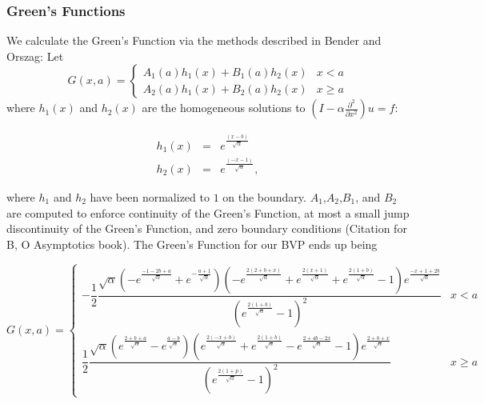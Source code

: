 \documentclass[11pt]{amsart}
\begin{document}
\subsubsection{Green's Functions}
We calculate the Green's Function via the methods described in Bender and Orszag: Let 
\begin{equation}
G(x,a)=\begin{cases}
A_1(a)h_1(x)+B_1(a)h_2(x) & x<a \\
A_2(a)h_1(x)+B_2(a)h_2(x) & x \geq a
\end{cases}
\end{equation}
where $h_1(x)$ and $h_2(x)$ are the homogeneous solutions to  $(I-\alpha \frac{\partial^2}{\partial x^2})u=f$:

\begin{eqnarray}
h_1(x) &=& e^{\frac{(x-b)}{\sqrt{\alpha}}} \\
h_2(x) &=& e^{\frac{(-x-1)}{\sqrt{\alpha}}},
\end{eqnarray}

where $h_1$ and $h_2$ have been normalized to $1$ on the boundary.  $A_1$,$A_2$,$B_1$, and $B_2$ are computed to enforce continuity of the Green's Function, at most a small jump discontinuity of the Green's Function, and zero boundary conditions (Citation for B, O Asymptotics book).  The Green's Function for our BVP ends up being

\begin{equation}
G(x,a)=\begin{cases} 
-\dfrac{1}{2} \dfrac{\sqrt{\alpha}\left(-e^{\frac{-1-2b+a}{\sqrt{\alpha}}}+e^{-\frac{a+1}{\sqrt{\alpha}}}\right)\left(-e^{\frac{2(2+b+x)}{\sqrt{\alpha}}}+e^{\frac{2(x+1)}{\sqrt{\alpha}}}+e^{\frac{2(1+b)}{\sqrt{\alpha}}}-1\right)e^{\frac{-x+1+2b}{\sqrt{\alpha}}}}{\left(e^{\frac{2(1+b)}{\sqrt{\alpha}}}-1\right)^2} & x<a \\
\dfrac{1}{2} \dfrac{\sqrt{\alpha} \left(e^{\frac{2+b+a}{\sqrt{\alpha}}} -e^{\frac{a-b}{\sqrt{\alpha}}}\right)\left(e^{\frac{2(-x+b)}{\sqrt{\alpha}}}+e^{\frac{2(1+b)}{\sqrt{\alpha}}}-e^{\frac{2+4b-2x}{\sqrt{\alpha}}}-1\right)e^{\frac{2+b+x}{\sqrt{\alpha}}}}{\left(e^{\frac{2(1+p)}{\sqrt{\alpha}}}-1\right)^2} & x \geq a

\end{cases}
\end{equation}
\end{document}
